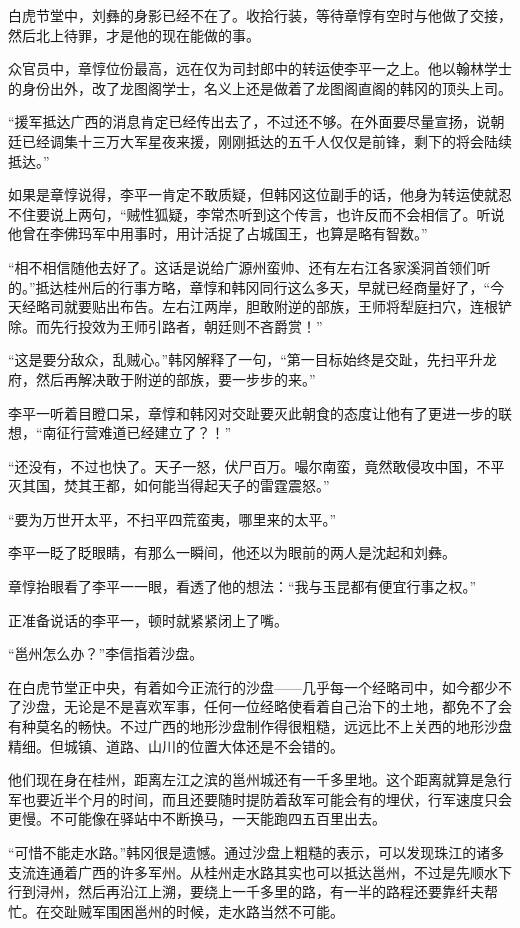 白虎节堂中，刘彝的身影已经不在了。收拾行装，等待章惇有空时与他做了交接，然后北上待罪，才是他的现在能做的事。

众官员中，章惇位份最高，远在仅为司封郎中的转运使李平一之上。他以翰林学士的身份出外，改了龙图阁学士，名义上还是做着了龙图阁直阁的韩冈的顶头上司。

“援军抵达广西的消息肯定已经传出去了，不过还不够。在外面要尽量宣扬，说朝廷已经调集十三万大军星夜来援，刚刚抵达的五千人仅仅是前锋，剩下的将会陆续抵达。”

如果是章惇说得，李平一肯定不敢质疑，但韩冈这位副手的话，他身为转运使就忍不住要说上两句，“贼性狐疑，李常杰听到这个传言，也许反而不会相信了。听说他曾在李佛玛军中用事时，用计活捉了占城国王，也算是略有智数。”

“相不相信随他去好了。这话是说给广源州蛮帅、还有左右江各家溪洞首领们听的。”抵达桂州后的行事方略，章惇和韩冈同行这么多天，早就已经商量好了，“今天经略司就要贴出布告。左右江两岸，胆敢附逆的部族，王师将犁庭扫穴，连根铲除。而先行投效为王师引路者，朝廷则不吝爵赏！”

“这是要分敌众，乱贼心。”韩冈解释了一句，“第一目标始终是交趾，先扫平升龙府，然后再解决敢于附逆的部族，要一步步的来。”

李平一听着目瞪口呆，章惇和韩冈对交趾要灭此朝食的态度让他有了更进一步的联想，“南征行营难道已经建立了？！”

“还没有，不过也快了。天子一怒，伏尸百万。嘬尔南蛮，竟然敢侵攻中国，不平灭其国，焚其王都，如何能当得起天子的雷霆震怒。”

“要为万世开太平，不扫平四荒蛮夷，哪里来的太平。”

李平一眨了眨眼睛，有那么一瞬间，他还以为眼前的两人是沈起和刘彝。

章惇抬眼看了李平一一眼，看透了他的想法：“我与玉昆都有便宜行事之权。”

正准备说话的李平一，顿时就紧紧闭上了嘴。

“邕州怎么办？”李信指着沙盘。

在白虎节堂正中央，有着如今正流行的沙盘——几乎每一个经略司中，如今都少不了沙盘，无论是不是喜欢军事，任何一位经略使看着自己治下的土地，都免不了会有种莫名的畅快。不过广西的地形沙盘制作得很粗糙，远远比不上关西的地形沙盘精细。但城镇、道路、山川的位置大体还是不会错的。

他们现在身在桂州，距离左江之滨的邕州城还有一千多里地。这个距离就算是急行军也要近半个月的时间，而且还要随时提防着敌军可能会有的埋伏，行军速度只会更慢。不可能像在驿站中不断换马，一天能跑四五百里出去。

“可惜不能走水路。”韩冈很是遗憾。通过沙盘上粗糙的表示，可以发现珠江的诸多支流连通着广西的许多军州。从桂州走水路其实也可以抵达邕州，不过是先顺水下行到浔州，然后再沿江上溯，要绕上一千多里的路，有一半的路程还要靠纤夫帮忙。在交趾贼军围困邕州的时候，走水路当然不可能。

